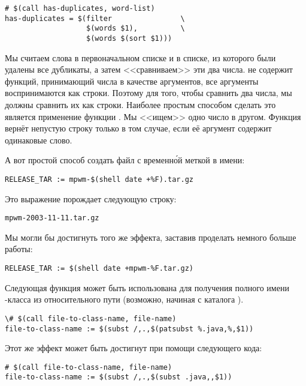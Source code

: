 {\footnotesize
\begin{verbatim}
# $(call has-duplicates, word-list)
has-duplicates = $(filter                \
                   $(words $1),          \
                   $(words $(sort $1)))
\end{verbatim}
}

Мы считаем слова в первоначальном списке и в списке, из которого были
удалены все дубликаты, а затем <<сравниваем>> эти два числа.
\GNUmake{} не содержит функций, принимающий числа в качестве
аргументов, все аргументы воспринимаются как строки. Поэтому для того,
чтобы сравнить два числа, мы должны сравнить их как строки. Наиболее
простым способом сделать это является применение функции
\function{filter}. Мы <<ищем>> одно число в другом. Функция
\function{has-duplicates} вернёт непустую строку только в том случае,
если её аргумент содержит одинаковые слово.

А вот простой способ создать файл с временн\'{о}й меткой в имени:

{\footnotesize
\begin{verbatim}
RELEASE_TAR := mpwm-$(shell date +%F).tar.gz
\end{verbatim}
}

Это выражение порождает следующую строку:

{\footnotesize
\begin{verbatim}
mpwm-2003-11-11.tar.gz
\end{verbatim}
}

Мы могли бы достигнуть того же эффекта, заставив 
проделать немного больше работы:

{\footnotesize
\begin{verbatim}
RELEASE_TAR := $(shell date +mpwm-%F.tar.gz)
\end{verbatim}
}

Следующая функция может быть использована для получения полного имени
\Java{}-класса из относительного пути (возможно, начиная с каталога
\filename{com}).

{\footnotesize
\begin{verbatim}
\# $(call file-to-class-name, file-name)
file-to-class-name := $(subst /,.,$(patsubst %.java,%,$1))
\end{verbatim}
}

Этот же эффект может быть достигнут при помощи следующего кода:

{\footnotesize
\begin{verbatim}
# $(call file-to-class-name, file-name)
file-to-class-name := $(subst /,.,$(subst .java,,$1))
\end{verbatim}
}

